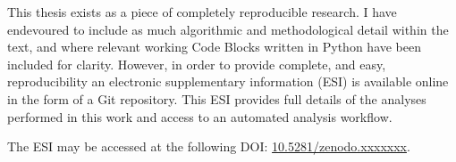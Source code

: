 \documentclass[
11pt, %
chapterinoneline,%
english, %
onehalfspacing
liststotoc, %
parskip, %
headsepline, %
]{reports/MastersDoctoralThesis} %
\begin{document}
\begin{usagestatement}
\addchaptertocentry{\usagename} %

This thesis exists as a piece of completely reproducible research.
I have endevoured to include as much algorithmic and methodological detail within the text, and where relevant working Code Blocks written in Python have been included for clarity.
However, in order to provide complete, and easy, reproducibility an electronic supplementary information (ESI) is available online in the form of a Git repository.
This ESI provides full details of the analyses performed in this work and access to an automated analysis workflow.

The ESI may be accessed at the following DOI: \href{https://doi.org/10.5281/zenodo.xxxxxxx}{10.5281/zenodo.xxxxxxx}.


\end{usagestatement}


\end{document}
